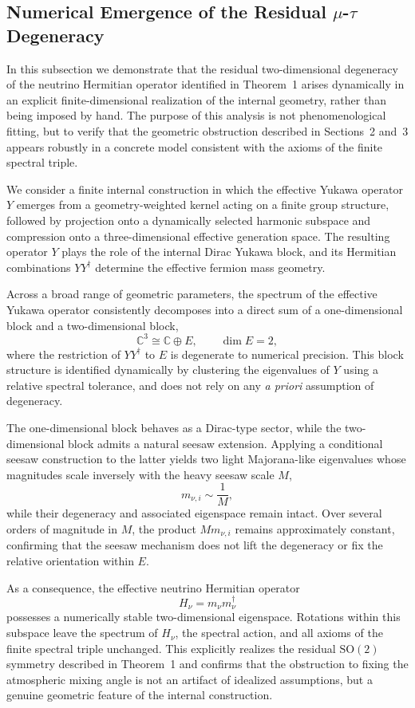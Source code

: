 \subsection{Numerical Emergence of the Residual $\mu$-$\tau$ Degeneracy}

In this subsection we demonstrate that the residual two-dimensional degeneracy of the neutrino Hermitian operator identified in Theorem~1 arises dynamically in an explicit finite-dimensional realization of the internal geometry, rather than being imposed by hand. The purpose of this analysis is not phenomenological fitting, but to verify that the geometric obstruction described in Sections~2 and~3 appears robustly in a concrete model consistent with the axioms of the finite spectral triple.

We consider a finite internal construction in which the effective Yukawa operator $Y$ emerges from a geometry-weighted kernel acting on a finite group structure, followed by projection onto a dynamically selected harmonic subspace and compression onto a three-dimensional effective generation space. The resulting operator $Y$ plays the role of the internal Dirac Yukawa block, and its Hermitian combinations $Y Y^\dagger$ determine the effective fermion mass geometry.

Across a broad range of geometric parameters, the spectrum of the effective Yukawa operator consistently decomposes into a direct sum of a one-dimensional block and a two-dimensional block,
\[
\mathbb C^3 \cong \mathbb C \oplus E,\qquad \dim E = 2,
\]
where the restriction of $Y Y^\dagger$ to $E$ is degenerate to numerical precision. This block structure is identified dynamically by clustering the eigenvalues of $Y$ using a relative spectral tolerance, and does not rely on any \emph{a priori} assumption of degeneracy.

The one-dimensional block behaves as a Dirac-type sector, while the two-dimensional block admits a natural seesaw extension. Applying a conditional seesaw construction to the latter yields two light Majorana-like eigenvalues whose magnitudes scale inversely with the heavy seesaw scale $M$,
\[
m_{\nu,i} \sim \frac{1}{M},
\]
while their degeneracy and associated eigenspace remain intact. Over several orders of magnitude in $M$, the product $M m_{\nu,i}$ remains approximately constant, confirming that the seesaw mechanism does not lift the degeneracy or fix the relative orientation within $E$.

As a consequence, the effective neutrino Hermitian operator
\[
H_\nu = m_\nu m_\nu^\dagger
\]
possesses a numerically stable two-dimensional eigenspace. Rotations within this subspace leave the spectrum of $H_\nu$, the spectral action, and all axioms of the finite spectral triple unchanged. This explicitly realizes the residual $\mathrm{SO}(2)$ symmetry described in Theorem~1 and confirms that the obstruction to fixing the atmospheric mixing angle is not an artifact of idealized assumptions, but a genuine geometric feature of the internal construction.

